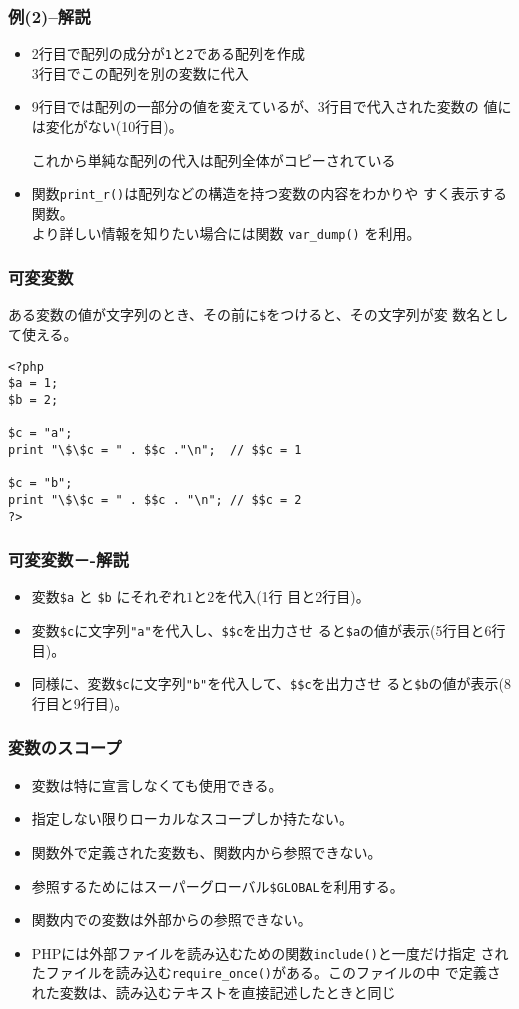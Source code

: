  \begin{frame}[containsverbatim]
  \frametitle{例(2)--解説}
 \begin{itemize}
 \item 2行目で配列の成分が\texttt{1}と\texttt{2}である配列を作成\\
       3行目でこの配列を別の変数に代入
 \item 9行目では配列の一部分の値を変えているが、3行目で代入された変数の
       値には変化がない(10行目)。

       これから単純な配列の代入は配列全体がコピーされている
 \item 関数\texttt{print\_r()}は配列などの構造を持つ変数の内容をわかりや
 すく表示する関数。\\より詳しい情報を知りたい場合には関数
       \verb+var_dump()+ を利用。
\end{itemize}
 \end{frame}
 \begin{frame}[containsverbatim]
  \frametitle{可変変数}
ある変数の値が文字列のとき、その前に\verb+$+をつけると、その文字列が変
  数名として使える。
\begin{verbatim}
<?php
$a = 1;
$b = 2;

$c = "a";
print "\$\$c = " . $$c ."\n";  // $$c = 1

$c = "b";
print "\$\$c = " . $$c . "\n"; // $$c = 2
?>
\end{verbatim}
 \end{frame}
 \begin{frame}[containsverbatim]
  \frametitle{可変変数－-解説}
  \begin{itemize}\upshape
   \item 変数\verb+$a+ と \verb+$b+ にそれぞれ$1$と$2$を代入(1行
         目と2行目)。
   \item 変数\verb+$c+に文字列\verb+"a"+を代入し、\verb+$$c+を出力させ
         ると\verb+$a+の値が表示(5行目と6行目)。
   \item 同様に、変数\verb+$c+に文字列\verb+"b"+を代入して、\verb+$$c+を出力させ
         ると\verb+$b+の値が表示(8行目と9行目)。
  \end{itemize}
 \end{frame}
\begin{frame}[containsverbatim]
\frametitle{変数のスコープ}
\begin{itemize}
 \item 変数は特に宣言しなくても使用できる。
 \item 指定しない限りローカルなスコープしか持たない。
 \item 関数外で定義された変数も、関数内から参照できない。
 \item 参照するためにはスーパーグローバル\verb+$GLOBAL+を利用する。
 \item 関数内での変数は外部からの参照できない。
 \item PHPには外部ファイルを読み込むための関数\texttt{include()}と一度だけ指定
されたファイルを読み込む\texttt{require\_once()}がある。このファイルの中
で定義された変数は、読み込むテキストを直接記述したときと同じ
\end{itemize}
\end{frame}

